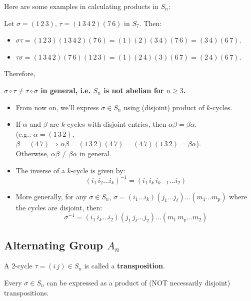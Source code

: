 Here are some examples in calculating products in $S_n$:
\begin{example}
Let $\sigma = (1\,2\,3)$, $\tau = (1\,3\,4\,2)(7\,6)$ in $S_7$. Then:
\begin{itemize}
    \item $\sigma\tau = (1\,2\,3)(1\,3\,4\,2)(7\,6) = (1)(2)(3\,4)(7\,6) = (3\,4)(6\,7)$.
    \item $\tau\sigma = (1\,3\,4\,2)(7\,6)(1\,2\,3) = (1)(2\,4)(3)(6\,7) = (2\,4)(6\,7)$.
\end{itemize}
Therefore, 
\begin{center}
{\bf $\sigma \circ \tau \neq \tau \circ \sigma$ in general, i.e. $S_n$ is not abelian for $n \geq 3$.} 
\end{center}
\end{example}
\vspace{1em}
\begin{remark}
\begin{itemize}
    \item From now on, we'll express $\sigma \in S_n$ using (disjoint) product of $k$-cycles.
    \item If $\alpha$ and $\beta$ are $k$-cycles with disjoint entries, then $\alpha\beta = \beta\alpha$. \\
    (e.g.: $\alpha = (1\,3\,2)$, $\beta = (4\,7) \Rightarrow \alpha\beta = (1\,3\,2)(4\,7) = (4\,7)(1\,3\,2) = \beta\alpha$). \\
    Otherwise, $\alpha\beta \neq \beta\alpha$ in general.
    \item The inverse of a $k$-cycle is given by:
    \[ (i_1\,i_2 \dots i_k)^{-1} = (i_1\,i_k\,i_{k-1} \dots i_2) \]
    \item More generally, for any $\sigma \in S_n$, $\sigma = (i_1 \dots i_k)(j_1 \dots j_\ell) \dots (m_1 \dots m_p)$ where the cycles are disjoint, then:
    \[ \sigma^{-1} = (i_1\,i_k \dots i_2)(j_1\,j_\ell \dots j_2) \dots (m_1\,m_p \dots m_2) \]
\end{itemize}
\end{remark}

\subsection*{Alternating Group $A_n$}
\begin{definition}[Transposition]
A 2-cycle $\tau = (i\,j) \in S_n$ is called a \textbf{transposition}.
\end{definition}
\vspace{1em}
\begin{proposition}
Every $\sigma \in S_n$ can be expressed as a product of (NOT necessarily disjoint) transpositions.
\end{proposition}

